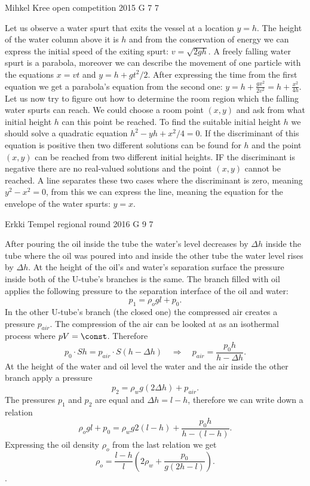 \documentclass[11pt]{article}
\begin{document}
{Mihkel Kree} %
{open competition} %
{2015} %
{G 7} %
{7} %
{

\ifEngSolution
Let us observe a water spurt that exits the vessel at a location $y=h$. The height of the water column above it is $h$ and from the conservation of energy we can express the initial speed of the exiting spurt: $v=\sqrt{2gh}$. A freely falling water spurt is a parabola, moreover we can describe the movement of one particle with the equations $x=vt$ and $y=h+gt^2/2$. After expressing the time from the first equation we get a parabola’s equation from the second one: $y = h + \frac{gx^2}{2v^2} = h + \frac{x^2}{4h}$. Let us now try to figure out how to determine the room region which the falling water spurts can reach. We could choose a room point $(x,y)$ and ask from what initial height $h$ can this point be reached. To find the suitable initial height $h$ we should solve a quadratic equation $h^2 - yh + x^2/4 = 0$. If the discriminant of this equation is positive then two different solutions can be found for $h$ and the point $(x,y)$ can be reached from two different initial heights. IF the discriminant is negative there are no real-valued solutions and the point $(x,y)$ cannot be reached. A line separates these two cases where the discriminant is zero, meaning $y^2 - x^2=0$, from this we can express the line, meaning the equation for the envelope of the water spurts: $y=x$.
\fi
}

{Erkki Tempel} %
{regional round} %
{2016} %
{G 9} %
{7} %
{

\ifEngSolution
After pouring the oil inside the tube the water’s level decreases by $\Delta h$ inside the tube where the oil was poured into and inside the other tube the water level rises by $\Delta h$. At the height of the oil’s and water’s separation surface the pressure inside both of the U-tube’s branches is the same. The branch filled with oil applies the following pressure to the separation interface of the oil and water:
\[ p_1 = \rho_{o}gl + p_0.\]
In the other U-tube’s branch (the closed one) the compressed air creates a pressure $p_{air}$. The compression of the air can be looked at as an isothermal process where $pV = \const$. Therefore
\[ p_0\cdot Sh = p_{air}\cdot S(h-\Delta h) \quad\Rightarrow\quad p_{air} = \frac{p_0h}{h-\Delta h}.\]
At the height of the water and oil level the water and the air inside the other branch apply a pressure
\[ p_2 = \rho_wg(2\Delta h) + p_{air}.\]
The pressures $p_1$ and $p_2$ are equal and $\Delta h = l - h$, therefore we can write down a relation
\[ \rho_{o}gl + p_0 = \rho_wg2(l-h) + \frac{p_0h}{h-(l-h)}.\]
Expressing the oil density $\rho_{o}$ from the last relation we get
\[ \rho_{o} = \frac{l-h}{l}\left(2\rho_w+\frac{p_0}{g(2h-l)}\right).\].
\fi
}
\newpage
\end{document}
